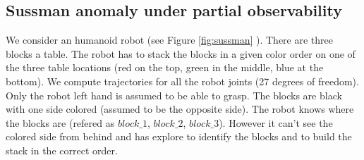 \documentclass[conference]{IEEEtran}
\begin{document}
\subsection{Sussman anomaly under partial observability}
We consider an humanoid robot (see Figure \ref{fig:sussman} ). There are three blocks a table. The robot has to stack the blocks in a given color order on one of the three table locations (red on the top, green in the middle, blue at the bottom). We compute trajectories for all the robot joints (27 degrees of freedom). Only the robot left hand is assumed to be able to grasp. The blocks are black with one side colored (assumed to be the opposite side). The robot knows where the blocks are (refered as $block\_1$, $block\_2$, $block\_3$). However it can't see the colored side from behind and has explore to identify the blocks and to build the stack in the correct order. 
\end{document}
